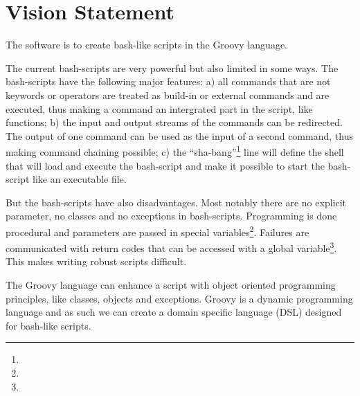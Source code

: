 \section{Vision Statement}

The software is to create bash-like scripts in the Groovy language.

The current bash-scripts are very powerful but also limited in some ways.
The bash-scripts have the following major features: a) all commands that are not
keywords or operators are treated as build-in or external commands and are
executed, thus making a command an intergrated part in the script, like
functions; b) the input and output streams of the commands can be redirected. The
output of one command can be used as the input of a second command, thus making
command chaining possible; c) the ``sha-bang''\footnote{} line 
will define the shell that will load
and execute the bash-script and make it possible to start the bash-script like an
executable file.

But the bash-scripts have also disadvantages. Most notably there are no 
explicit parameter, no classes and no exceptions in bash-scripts. Programming 
is done procedural and parameters are passed in special 
variables\footnote{}. Failures are communicated with
return codes that can be accessed with a global variable\footnote{}.
This makes writing robust scripts difficult.

The Groovy language can enhance a script with 
object oriented programming principles, like classes, objects and exceptions.
Groovy is a dynamic programming language and as such we can create a domain 
specific language (DSL) designed for bash-like scripts.


